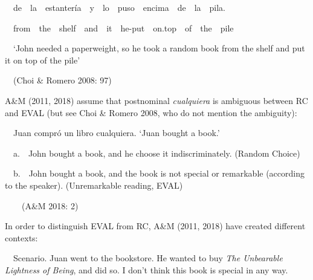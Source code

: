 \begin{styleStandard}
\ \ de\ \ la\ \ estantería\ \ y\ \ lo\ \ puso\ \ encima\ \ de\ \ la\ \ pila.\ \ 
\end{styleStandard}

\begin{styleStandard}
\ \ from\ \ the\ \ shelf\ \ and\ \ it\ \ he-put\ \ on.top\ \ of\ \ the\ \ pile\ \ 
\end{styleStandard}

\begin{styleStandard}
\ \ ‘John needed a paperweight, so he took a random book from the shelf and put it on top of the pile’
\end{styleStandard}

\begin{styleStandard}
\ \ (Choi \& Romero 2008: 97)
\end{styleStandard}

\begin{styleStandard}
A\&M (2011, 2018) assume that postnominal \textit{cualquiera} is ambiguous between RC and EVAL (but see Choi \& Romero 2008, who do not mention the ambiguity):
\end{styleStandard}

\begin{styleStandard}
\label{bkm:Ref533953640}\ \ Juan compró un libro cualquiera. ‘Juan bought a book.’
\end{styleStandard}

\begin{styleStandard}
\ \ a.\ \ John bought a book, and he choose it indiscriminately. (Random Choice)
\end{styleStandard}

\begin{styleStandard}
\ \ b.\ \ John bought a book, and the book is not special or remarkable (according to the speaker). (Unremarkable reading, EVAL)
\end{styleStandard}

\begin{styleStandard}
\ \ \ \ (A\&M 2018: 2)
\end{styleStandard}

\begin{styleStandard}
In order to distinguish EVAL from RC, A\&M (2011, 2018) have created different contexts:
\end{styleStandard}

\begin{styleStandard}
\label{bkm:Ref54686706}\ \ Scenario. Juan went to the bookstore. He wanted to buy \textit{The Unbearable Lightness of Being}, and did so. I don’t think this book is special in any way.
\end{styleStandard}

